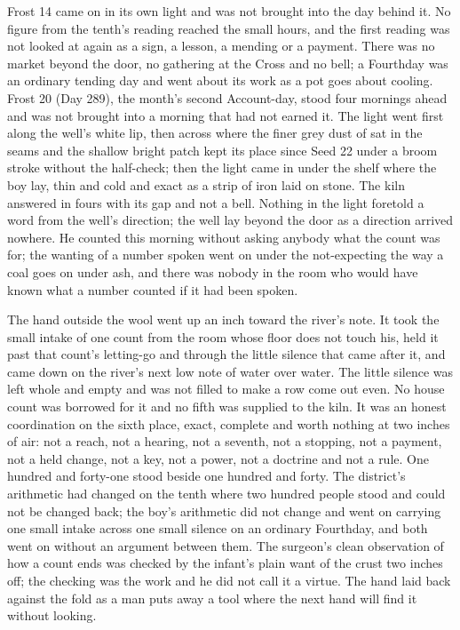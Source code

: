 Frost 14 came on in its own light and was not brought into the day behind it. No figure from the tenth's reading reached the small hours, and the first reading was not looked at again as a sign, a lesson, a mending or a payment. There was no market beyond the door, no gathering at the Cross and no bell; a Fourthday was an ordinary tending day and went about its work as a pot goes about cooling. Frost 20 (Day 289), the month's second Account-day, stood four mornings ahead and was not brought into a morning that had not earned it. The light went first along the well's white lip, then across  where the finer grey dust of  sat in the seams and the shallow bright patch kept its place since Seed 22 under a broom stroke without the half-check; then the light came in under the shelf where the boy lay, thin and cold and exact as a strip of iron laid on stone. The kiln answered in fours with its gap and not a bell. Nothing in the light foretold a word from the well's direction; the well lay beyond the door as a direction arrived nowhere. He counted this morning without asking anybody what the count was for; the wanting of a number spoken went on under the not-expecting the way a coal goes on under ash, and there was nobody in the room who would have known what a number counted if it had been spoken.

The hand outside the wool went up an inch toward the river's note. It took the small intake of one count from the room whose floor does not touch his, held it past that count's letting-go and through the little silence that came after it, and came down on the river's next low note of water over water. The little silence was left whole and empty and was not filled to make a row come out even. No house count was borrowed for it and no fifth was supplied to the kiln. It was an honest coordination on the sixth place, exact, complete and worth nothing at two inches of air: not a reach, not a hearing, not a seventh, not a stopping, not a payment, not a held change, not a key, not a power, not a doctrine and not a rule. One hundred and forty-one stood beside one hundred and forty. The district's arithmetic had changed on the tenth where two hundred people stood and could not be changed back; the boy's arithmetic did not change and went on carrying one small intake across one small silence on an ordinary Fourthday, and both went on without an argument between them. The surgeon's clean observation of how a count ends was checked by the infant's plain want of the crust two inches off; the checking was the work and he did not call it a virtue. The hand laid back against the fold as a man puts away a tool where the next hand will find it without looking.

